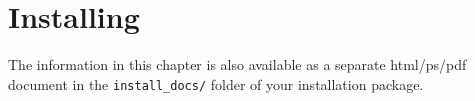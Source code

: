 \chapter{Installing \MCS}
\label{installing}
The information in this chapter is also available as a separate
html/ps/pdf document in the \texttt{install\_docs/} folder of your
\MCS installation package.

% 
